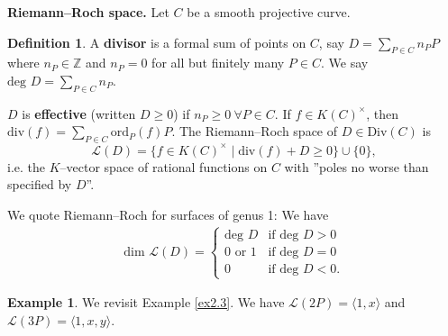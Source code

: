 \documentclass{article}
\theoremstyle{definition}
\newtheorem{example}{Example}[section]
\newtheorem{defn}{Definition}[section]
\begin{document}
\textbf{Riemann--Roch space.} Let $C$ be a smooth projective curve. 
\begin{defn}
    A \textbf{divisor} is a formal sum of points on $C$, say $D = \sum_{P \in C}^{} n_P P$ where $n_P \in \mathbb{Z}$ and $n_P = 0$ for all but finitely many $P \in C$. We say $\text{deg }D= \sum_{P \in C}^{} n_P$.
    \vspace{1mm}
     
    $D$ is \textbf{effective} (written $D\ge 0$) if $n_P \ge 0 ~\forall P \in C$. If $f \in K(C)^\times$, then $\text{div}(f) = \sum_{P \in C}^{} \text{ord}_P(f)P$. The Riemann--Roch space of $D \in \text{Div}(C)$ is  
    \[
        \mathcal{L}(D) = \{f \in K(C)^\times \mid \text{div}(f) + D \ge 0\} \cup \{0\},
    \]
    i.e. the $K$--vector space of rational functions on $C$ with ''poles no worse than specified by $D$''.
\end{defn}
We quote Riemann--Roch for surfaces of genus 1: We have
\begin{align*}
    \text{dim }\mathcal{L}(D) = \begin{cases}
        \text{deg }D &\text{if deg }D>0\\
        0 \text{ or }1 &\text{if deg }D=0\\
        0 &\text{if deg }D<0.
    \end{cases}
\end{align*}
\begin{example}
    We revisit Example \ref{ex2.3}. We have $\mathcal{L}(2P) = \langle 1,x \rangle$ and $\mathcal{L}(3P) = \langle 1,x,y \rangle$.
\end{example}
\end{document}
